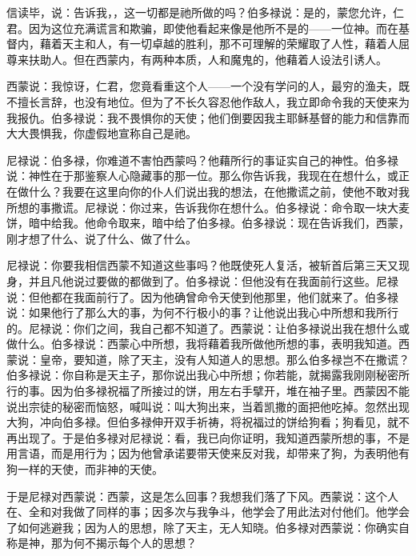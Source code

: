 信读毕，说：告诉我，，这一切都是祂所做的吗？伯多禄说：是的，蒙您允许，仁君。因为这位充满谎言和欺骗，即使他看起来像是他所不是的——一位神。而在基督内，藉着天主和人，有一切卓越的胜利，那不可理解的荣耀取了人性，藉着人屈尊来扶助人。但在西蒙内，有两种本质，人和魔鬼的，他藉着人设法引诱人。\par

西蒙说：我惊讶，仁君，您竟看重这个人——一个没有学问的人，最穷的渔夫，既不擅长言辞，也没有地位。但为了不长久容忍他作敌人，我立即命令我的天使来为我报仇。伯多禄说：我不畏惧你的天使；他们倒要因我主耶稣基督的能力和信靠而大大畏惧我，你虚假地宣称自己是祂。\par

尼禄说：伯多禄，你难道不害怕西蒙吗？他藉所行的事证实自己的神性。伯多禄说：神性在于那鉴察人心隐藏事的那一位。那么你告诉我，我现在在想什么，或正在做什么？我要在这里向你的仆人们说出我的想法，在他撒谎之前，使他不敢对我所想的事撒谎。尼禄说：你过来，告诉我你在想什么。伯多禄说：命令取一块大麦饼，暗中给我。他命令取来，暗中给了伯多禄。伯多禄说：现在告诉我们，西蒙，刚才想了什么、说了什么、做了什么。\par

尼禄说：你要我相信西蒙不知道这些事吗？他既使死人复活，被斩首后第三天又现身，并且凡他说过要做的都做到了。伯多禄说：但他没有在我面前行这些。尼禄说：但他都在我面前行了。因为他确曾命令天使到他那里，他们就来了。伯多禄说：如果他行了那么大的事，为何不行极小的事？让他说出我心中所想和我所行的。尼禄说：你们之间，我自己都不知道了。西蒙说：让伯多禄说出我在想什么或做什么。伯多禄说：西蒙心中所想，我将藉着我所做他所想的事，表明我知道。西蒙说：皇帝，要知道，除了天主，没有人知道人的思想。那么伯多禄岂不在撒谎？伯多禄说：你自称是天主子，那你说出我心中所想；你若能，就揭露我刚刚秘密所行的事。因为伯多禄祝福了所接过的饼，用左右手擘开，堆在袖子里。西蒙因不能说出宗徒的秘密而恼怒，喊叫说：叫大狗出来，当着凯撒的面把他吃掉。忽然出现大狗，冲向伯多禄。但伯多禄伸开双手祈祷，将祝福过的饼给狗看；狗看见，就不再出现了。于是伯多禄对尼禄说：看，我已向你证明，我知道西蒙所想的事，不是用言语，而是用行为；因为他曾承诺要带天使来反对我，却带来了狗，为表明他有狗一样的天使，而非神的天使。\par

于是尼禄对西蒙说：西蒙，这是怎么回事？我想我们落了下风。西蒙说：这个人在、全和对我做了同样的事；因多次与我争斗，他学会了用此法对付他们。他学会了如何逃避我；因为人的思想，除了天主，无人知晓。伯多禄对西蒙说：你确实自称是神，那为何不揭示每个人的思想？\par

